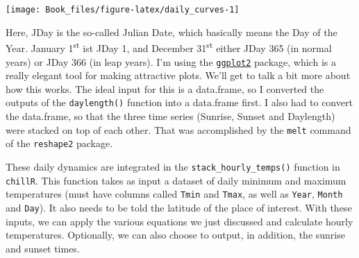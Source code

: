 \documentclass[
]{book}
\newenvironment{Shaded}{\begin{snugshade}}{\end{snugshade}}
\newcommand{\DataTypeTok}[1]{\textcolor[rgb]{0.13,0.29,0.53}{#1}}
\newcommand{\DecValTok}[1]{\textcolor[rgb]{0.00,0.00,0.81}{#1}}
\newcommand{\FloatTok}[1]{\textcolor[rgb]{0.00,0.00,0.81}{#1}}
\newcommand{\KeywordTok}[1]{\textcolor[rgb]{0.13,0.29,0.53}{\textbf{#1}}}
\newcommand{\NormalTok}[1]{#1}
\newcommand{\OperatorTok}[1]{\textcolor[rgb]{0.81,0.36,0.00}{\textbf{#1}}}
\newcommand{\StringTok}[1]{\textcolor[rgb]{0.31,0.60,0.02}{#1}}
\begin{document}
\begin{Shaded}
\end{Shaded}

\texttt{[image: Book\_files/figure-latex/daily\_curves-1]}

Here, JDay is the so-called Julian Date, which basically means the Day of the Year. January 1\textsuperscript{st} ist JDay 1, and December 31\textsuperscript{st} either JDay 365 (in normal years) or JDay 366 (in leap years). I'm using the \href{https://ggplot2.tidyverse.org/}{\texttt{ggplot2}} package, which is a really elegant tool for making attractive plots. We'll get to talk a bit more about how this works. The ideal input for this is a data.frame, so I converted the outputs of the \texttt{daylength()} function into a data.frame first. I also had to convert the data.frame, so that the three time series (Sunrise, Sunset and Daylength) were stacked on top of each other. That was accomplished by the \texttt{melt} command of the \texttt{reshape2} package.

These daily dynamics are integrated in the \texttt{stack\_hourly\_temps()} function in \texttt{chillR}. This function takes as input a dataset of daily minimum and maximum temperatures (must have columns called \texttt{Tmin} and \texttt{Tmax}, as well as \texttt{Year}, \texttt{Month} and \texttt{Day}). It also needs to be told the latitude of the place of interest. With these inputs, we can apply the various equations we just discussed and calculate hourly temperatures. Optionally, we can also choose to output, in addition, the sunrise and sunset times.
\end{document}
